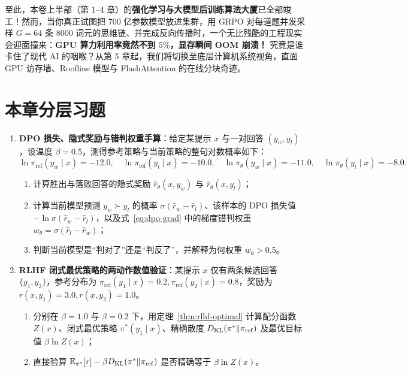 至此，本卷上半部（第 1--4 章）的\textbf{强化学习与大模型后训练算法大厦}已全部竣工！然而，当你真正试图把 700 亿参数模型放进集群，用 GRPO 对每道题并发采样 $G=64$ 条 8000 词元的思维链、并完成反向传播时，一个无比残酷的工程现实会迎面撞来：\textbf{GPU 算力利用率竟然不到 $5\%$，显存瞬间 OOM 崩溃！} 究竟是谁卡住了现代 AI 的咽喉？从第 5 章起，我们将切换至底层计算机系统视角，直面 GPU 访存墙、Roofline 模型与 FlashAttention 的在线分块奇迹。

\section*{本章分层习题}


\begin{enumerate}
  \item[\textbf{6.4.1}] \textbf{DPO 损失、隐式奖励与错判权重手算}：给定某提示 $x$ 与一对回答 $(y_w, y_l)$，设温度 $\beta = 0.5$，测得参考策略与当前策略的整句对数概率如下：
  \[
    \ln \pi_{\mathrm{ref}}(y_w \mid x) = -12.0, \quad
    \ln \pi_{\mathrm{ref}}(y_l \mid x) = -10.0, \quad
    \ln \pi_\theta(y_w \mid x) = -11.0, \quad
    \ln \pi_\theta(y_l \mid x) = -8.0.
  \]
  \begin{enumerate}
    \item 计算胜出与落败回答的隐式奖励 $\hat{r}_\theta(x, y_w)$ 与 $\hat{r}_\theta(x, y_l)$；
    \item 计算当前模型预测 $y_w \succ y_l$ 的概率 $\sigma(\hat{r}_w - \hat{r}_l)$、该样本的 DPO 损失值 $-\ln\sigma(\hat{r}_w - \hat{r}_l)$，以及式~\eqref{eq:dpo-grad} 中的梯度错判权重 $w_\theta = \sigma(\hat{r}_l - \hat{r}_w)$；
    \item 判断当前模型是“判对了”还是“判反了”，并解释为何权重 $w_\theta > 0.5$。
  \end{enumerate}

  \item[\textbf{6.4.2}] \textbf{RLHF 闭式最优策略的两动作数值验证}：某提示 $x$ 仅有两条候选回答 $\{y_1, y_2\}$，参考分布为 $\pi_{\mathrm{ref}}(y_1 \mid x) = 0.2, \pi_{\mathrm{ref}}(y_2 \mid x) = 0.8$，奖励为 $r(x, y_1) = 3.0, r(x, y_2) = 1.0$。
  \begin{enumerate}
    \item 分别在 $\beta = 1.0$ 与 $\beta = 0.2$ 下，用定理~\ref{thm:rlhf-optimal} 计算配分函数 $Z(x)$、闭式最优策略 $\pi^*(y_1\mid x)$、精确散度 $D_{\mathrm{KL}}(\pi^* \| \pi_{\mathrm{ref}})$ 及最优目标值 $\beta \ln Z(x)$；
    \item 直接验算 $\mathbb{E}_{\pi^*}[r] - \beta D_{\mathrm{KL}}(\pi^* \| \pi_{\mathrm{ref}})$ 是否精确等于 $\beta \ln Z(x)$。
  \end{enumerate}
\end{enumerate}

